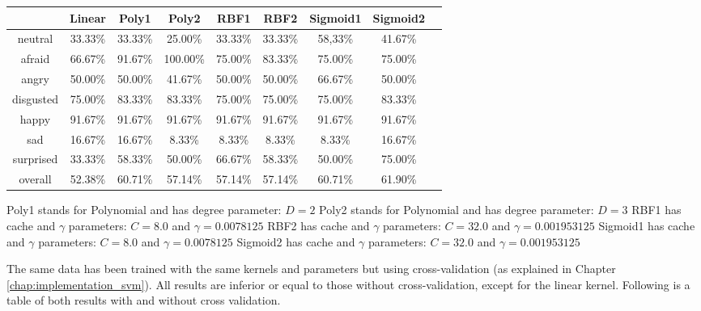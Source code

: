 \vspace{\baselineskip}
\begin {center}
\begin{tabular}{|c|c|c|c|c|c|c|c|c|}
  \hline
    & Linear & Poly1 & Poly2 & RBF1 & RBF2 & Sigmoid1 & Sigmoid2 \\
  \hline
  neutral & 33.33\% & 33.33\% & 25.00\% & 33.33\% & 33.33\% & 58,33\% & 41.67\% \\
  afraid & 66.67\% & 91.67\% & 100.00\% & 75.00\% & 83.33\% & 75.00\% & 75.00\% \\
  angry & 50.00\% & 50.00\% & 41.67\% & 50.00\% & 50.00\% & 66.67\% & 50.00\% \\
  disgusted & 75.00\% & 83.33\% & 83.33\% & 75.00\% & 75.00\% & 75.00\% & 83.33\% \\
  happy & 91.67\% & 91.67\% & 91.67\% & 91.67\% & 91.67\% & 91.67\% & 91.67\% \\
  sad & 16.67\% & 16.67\% & 8.33\% & 8.33\% & 8.33\% & 8.33\% & 16.67\% \\
  surprised & 33.33\% & 58.33\% & 50.00\% & 66.67\% & 58.33\% & 50.00\% & 75.00\% \\
  overall & 52.38\% & 60.71\% & 57.14\% & 57.14\% & 57.14\% & 60.71\% & 61.90\% \\
  \hline
\end{tabular}
\end {center}

\vspace{\baselineskip}
\vspace{\baselineskip}
\noindent Poly1 stands for Polynomial and has degree parameter: $ D = 2 $
\newline
\noindent Poly2 stands for Polynomial and has degree parameter: $ D = 3 $
\newline
\noindent RBF1 has cache and $\gamma$ parameters: $ C = 8.0 $ and $ \gamma = 0.0078125 $
\newline
\noindent RBF2 has cache and $\gamma$ parameters: $ C = 32.0 $ and $ \gamma = 0.001953125 $ 
\newline
\noindent Sigmoid1 has cache and $\gamma$ parameters: $ C = 8.0 $ and $ \gamma = 0.0078125 $
\newline
\noindent Sigmoid2 has cache and $\gamma$ parameters: $ C = 32.0 $ and $ \gamma = 0.001953125 $
\newline

\noindent The same data has been trained with the same kernels and parameters but using cross-validation (as explained in Chapter \ref{chap:implementation_svm}). All results are inferior or equal to those without cross-validation, except for the linear kernel. Following is a table of both results with and without cross validation.
\newline

